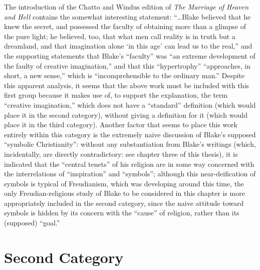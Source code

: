 The introduction of the Chatto and Windus edition of
\emph{The Marriage of Heaven and Hell}\supercite{blake:heaven-and-hell}
contains the somewhat interesting statement: \enquote{\dots Blake believed that he knew the
secret, and possessed the faculty of obtaining more than a glimpse of the pure light; he believed, too, that
what men call reality is in truth but a dreamland, and that imagination alone \enquote*{in this age} can lead us to the real,} and
the supporting statements that Blake's \enquote{faculty} was \enquote{an extreme development of the
faulty of creative imagination,} and that this \enquote{hypertrophy} \enquote{approaches, in short, a new sense,} which is
\enquote{incomprehensible to the ordinary man.} Despite this apparent analysis, it seems that the above work must
be included with this first group because it makes use of, to support the explanation, the
term \enquote{creative imagination,} which does not have a \enquote{standard} definition (which would
place it in the second category), without giving a definition for it (which would place it in the
third category). Another factor that seems to place this work entirely within
this category is the extremely naive discussion of Blake's supposed \enquote{symbolic Christianity}: without
any substantiation from Blake's writings (which, incidentally, are directly contradictory: see chapter three of this thesis),
it is indicated that the \enquote{central tenets} of his religion are in some way concerned with the interrelations
of \enquote{inspiration} and \enquote{symbols}; although this near-deification of symbols is typical of Freudianism, which
was developing around this time, the only Freudian-religious study of Blake to be considered in this chapter is more
appropriately included in the second category, since the naive attitude toward symbols is hidden by its concern with
the \enquote{cause} of religion, rather than its (supposed) \enquote{goal.}

\section{Second Category}

